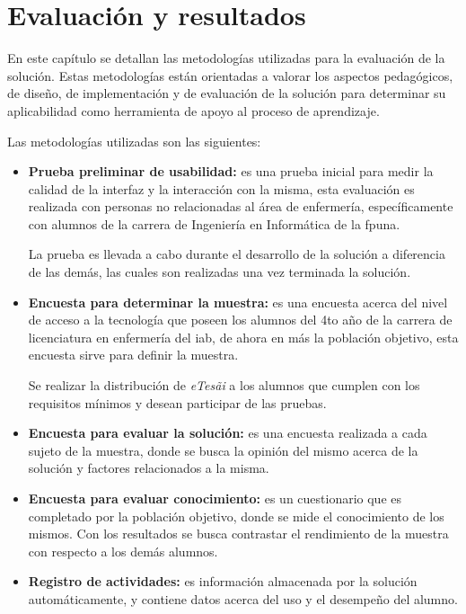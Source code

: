 \chapter{Evaluación y resultados}
\label{chap:evaluacion}


En este capítulo se detallan las metodologías utilizadas para la evaluación de
la solución. Estas metodologías están orientadas a valorar los aspectos
pedagógicos, de diseño, de implementación y de evaluación de la solución para
determinar su aplicabilidad como herramienta de apoyo al proceso de aprendizaje.

Las metodologías utilizadas son las siguientes:

\begin{itemize}

    \item \textbf{Prueba preliminar de usabilidad:} es una prueba inicial para
        medir la calidad de la interfaz y la interacción con la misma, esta
        evaluación es realizada con personas no relacionadas al área de
        enfermería, específicamente con alumnos de la carrera de
        Ingeniería en Informática de la \gls{fpuna}.

        La prueba es llevada a cabo durante el desarrollo de la solución a
        diferencia de las demás, las cuales son realizadas una vez terminada la
        solución.

    \item \textbf{Encuesta para determinar la muestra:} es una encuesta acerca
        del nivel de acceso a la tecnología que poseen los alumnos del 4to año
        de la carrera de licenciatura en enfermería del \Gls{iab}, de ahora en
        más la población objetivo, esta encuesta sirve para definir la muestra.

        Se realizar la distribución de \textit{eTes\~{a}i} a los
        alumnos que cumplen con los requisitos mínimos y desean participar de
        las pruebas.

    \item \textbf{Encuesta para evaluar la solución:} es una encuesta realizada
        a cada sujeto de la muestra, donde se busca la opinión del mismo acerca
        de la solución y factores relacionados a la misma.

    \item \textbf{Encuesta para evaluar conocimiento:} es un cuestionario que es
        completado por la población objetivo, donde se mide el conocimiento de
        los mismos. Con los resultados se busca contrastar el rendimiento de la
        muestra con respecto a los demás alumnos.

    \item \textbf{Registro de actividades:} es información almacenada por la
        solución automáticamente, y contiene datos acerca del uso y el desempeño
        del alumno.

\end{itemize}


